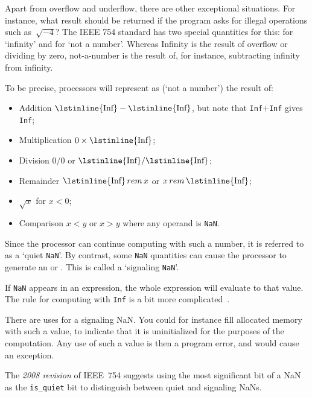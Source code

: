 Apart from overflow and underflow, there are other
exceptional situations.
For instance,
what result should be returned if the program asks for
illegal operations such as~$\sqrt{-4}$? The IEEE 754 standard has two
special quantities for this:
  for `infinity' and  for `not a number'.
Whereas Infinity is the result of overflow or
dividing by zero, not-a-number is the result of, for instance,
subtracting infinity from infinity.  

To be precise,
processors will represent as  
(`not a number')
the result of:

\begin{itemize}
\item Addition $\hbox{\lstinline{Inf}}-\hbox{\lstinline{Inf}}$,
  but note that \hbox{\lstinline{Inf}}$+$\hbox{\lstinline{Inf}} gives \hbox{\lstinline{Inf}};
\item Multiplication $0\times\hbox{\lstinline{Inf}}$;
\item Division $0/0$ or $\hbox{\lstinline{Inf}}/\hbox{\lstinline{Inf}}$;
\item Remainder $\hbox{\lstinline{Inf}}\mathop{\mathrel{rem}} x$ or
  $x\mathop{\mathrel{rem}} \hbox{\lstinline{Inf}}$;
\item $\sqrt{x}$ for $x<0$;
\item Comparison $x<y$ or $x>y$ where any operand is \lstinline{NaN}.
\end{itemize}

Since the processor can continue computing with such a number, it is
referred to as a `quiet \lstinline{NaN}'.
By contrast, some \lstinline{NaN}
quantities can cause the processor to generate an
 or .
This is called a
`signaling \lstinline{NaN}'.

If \lstinline{NaN} appears in an
expression, the whole expression will evaluate to that value. The rule
for computing with \lstinline{Inf} is a bit more
complicated~\cite{goldberg:floatingpoint}.

There are uses for a signaling NaN. You could for instance fill
allocated memory with such a value, to indicate that it is
uninitialized for the purposes of the computation. Any use of such a
value is then a program error, and would cause an exception.

The \emph{2008 revision}
of IEEE~754 suggests using the most
significant bit of a NaN as the \lstinline{is_quiet} bit to distinguish
between quiet and signaling NaNs.

